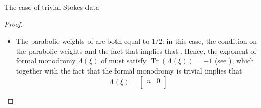 \begin{subsubsection}{The case of trivial Stokes data}
\begin{proof}
\begin{itemize}
This connection has a frame of flat sections defined over $\mathbb{C} \subset \CP$, given by $g_0\cdot \exp \smash{\bigl(\bigl(-\frac{z^2\xi^{-1}}{2}}\allowbreak-\smash{\frac{\overline{z}^{2}\xi}{2}\bigr)H\bigr)}$ satisfying the appropriate asymptotics with respect to $\tau_0^{\xi}$ (and $g_0$). From this fact, we see that the formal monodromy and the associated Stokes matrices are trivial.
Now going back to , the fact that it comes from a harmonic bundle implies that , while the assumption on the parabolic weights imply that . Since it also has trivial Stokes data, the Riemann--Hilbert correspondence for framed flat bundles presented in $\cite{BB04}$ implies that  is isomorphic to  (as compatibly framed flat bundles). In particular,  is isomorphic with , so that  is isomorphic to $\bigl(E_0,\overline{\partial}_{E_0},\theta_0,h_0\bigr)$. Hence,
\begin{equation*}
 -\bigl(z^2+2m\bigr){\rm d}z^2=\operatorname{Det}(\theta)=\operatorname{Det}(\theta_0)=-z^2{\rm d}z^2,
\end{equation*} which implies that $m=0$.
\item The parabolic weights of  are both equal to $1/2$: in this case, the condition on the parabolic weights and the fact that  implies that . Hence, the exponent of formal monodromy $\Lambda(\xi)$ of  must satisfy $\operatorname{Tr}(\Lambda(\xi))\allowbreak=-1$ (see \cite{B}), which together with the fact that the formal monodromy is trivial implies that
\begin{equation*}
 \Lambda(\xi)=\begin{bmatrix} n & 0 \\

\end{bmatrix}
\end{equation*}
\end{itemize}
\end{proof}
\end{subsubsection}
